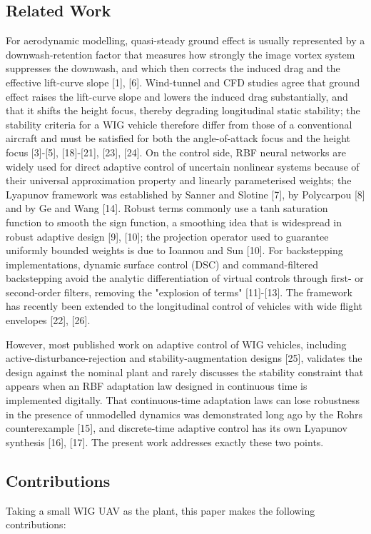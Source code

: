 \documentclass[conference]{IEEEtran}
\begin{document}
\subsection{Related Work}
For aerodynamic modelling, quasi-steady ground effect is usually represented by a downwash-retention factor that measures how strongly the image vortex system suppresses the downwash, and which then corrects the induced drag and the effective lift-curve slope [1], [6]. Wind-tunnel and CFD studies agree that ground effect raises the lift-curve slope and lowers the induced drag substantially, and that it shifts the height focus, thereby degrading longitudinal static stability; the stability criteria for a WIG vehicle therefore differ from those of a conventional aircraft and must be satisfied for both the angle-of-attack focus and the height focus [3]-[5], [18]-[21], [23], [24]. On the control side, RBF neural networks are widely used for direct adaptive control of uncertain nonlinear systems because of their universal approximation property and linearly parameterised weights; the Lyapunov framework was established by Sanner and Slotine [7], by Polycarpou [8] and by Ge and Wang [14]. Robust terms commonly use a tanh saturation function to smooth the sign function, a smoothing idea that is widespread in robust adaptive design [9], [10]; the projection operator used to guarantee uniformly bounded weights is due to Ioannou and Sun [10]. For backstepping implementations, dynamic surface control (DSC) and command-filtered backstepping avoid the analytic differentiation of virtual controls through first- or second-order filters, removing the "explosion of terms" [11]-[13]. The framework has recently been extended to the longitudinal control of vehicles with wide flight envelopes [22], [26].

However, most published work on adaptive control of WIG vehicles, including active-disturbance-rejection and stability-augmentation designs [25], validates the design against the nominal plant and rarely discusses the stability constraint that appears when an RBF adaptation law designed in continuous time is implemented digitally. That continuous-time adaptation laws can lose robustness in the presence of unmodelled dynamics was demonstrated long ago by the Rohrs counterexample [15], and discrete-time adaptive control has its own Lyapunov synthesis [16], [17]. The present work addresses exactly these two points.

\subsection{Contributions}
Taking a small WIG UAV as the plant, this paper makes the following contributions:
\end{document}
